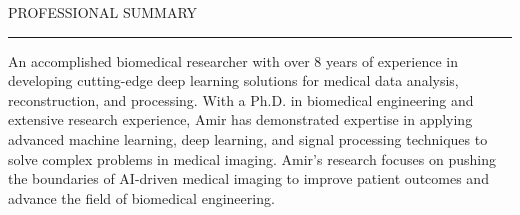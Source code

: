 \documentclass{resume} %
\renewenvironment{rSection}[1]{
\sectionskip
\textcolor{RoyalPurple}{\MakeUppercase{#1}}
\sectionlineskip
\hrule
\begin{list}{}{
\setlength{\leftmargin}{1.5em}
}
\item[]
}{
\end{list}
}
\begin{document}
\begin{rSection}{professional summary}
An accomplished biomedical researcher with over 8 years of experience in developing cutting-edge deep learning solutions for medical data analysis, reconstruction, and processing. With a Ph.D. in biomedical engineering and extensive research experience, Amir has demonstrated expertise in applying advanced machine learning, deep learning, and signal processing techniques to solve complex problems in medical imaging. Amir's research focuses on pushing the boundaries of AI-driven medical imaging to improve patient outcomes and advance the field of biomedical engineering.
\end{rSection}


\end{document}
